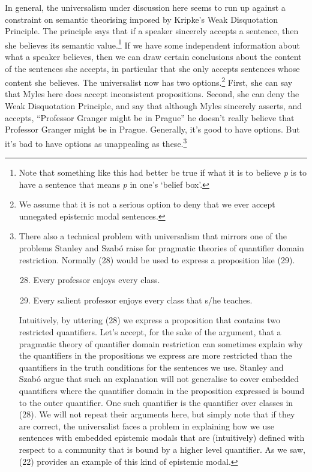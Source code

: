 In general, the universalism under discussion here seems to run up against a constraint on semantic theorising imposed by Kripke's Weak Disquotation Principle. The principle says that if a speaker sincerely accepts a sentence, then she believes its semantic value.\footnote{Note that something like this had better 
be true if what it is to believe \textit{p} is to have a sentence that means \textit{p} in one's `belief box'.} If we have some independent information about what a speaker believes, then we can draw certain conclusions about the content of the sentences she accepts, in particular that she only accepts sentences whose content she believes. The universalist now has two options.\footnote{We assume that it is not a serious option to deny that we ever accept unnegated epistemic modal sentences. } First, she can say that Myles here does accept inconsistent propositions. Second, she can deny the Weak Disquotation Principle, and say that although Myles sincerely asserts, and accepts, ``Professor Granger might be in Prague'' he doesn't really believe that Professor Granger might be in Prague. Generally, it's good to have options. But it's bad to have options as unappealing as these.\footnote{There also a technical problem with universalism that mirrors one of the problems Stanley and Szab\'{o} \citeyearpar{Stanley2000-STAOQD} raise for pragmatic theories of quantifier domain restriction. Normally (28) would be used to express a proposition like (29).
\begin{enumerate}
\setcounter{enumi}{27}
\item Every professor enjoys every class.
\item Every salient professor enjoys every class that s/he teaches.
\end{enumerate}
\noindent  Intuitively, by uttering (28) we express a proposition that contains two restricted quantifiers. Let's accept, for the sake of the argument, that a pragmatic theory of quantifier domain restriction can sometimes explain why the quantifiers in the propositions we express are more restricted than the quantifiers in the truth conditions for the sentences we use. Stanley and Szab\'{o} argue that such an explanation will not generalise to cover embedded quantifiers where the quantifier domain in the proposition expressed is bound to the outer quantifier. One such quantifier is the quantifier over classes in (28). We will not repeat their arguments here, but simply note that if they are correct, the universalist faces a problem in explaining how we use sentences with embedded epistemic modals that are (intuitively) defined with respect to a community that is bound by a higher level quantifier. As we saw, (22) provides an example of this kind of epistemic modal.}
 
